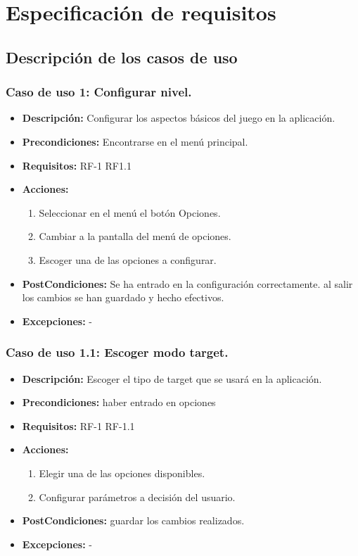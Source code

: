 \section{Especificación de requisitos}

\subsection{Descripción de los casos de uso}
\subsubsection{Caso de uso 1: Configurar nivel.}
\begin{itemize}
	\item \textbf{Descripción:} Configurar los aspectos básicos del juego en la aplicación.
	\item \textbf{Precondiciones:} Encontrarse en el menú principal.
	\item \textbf{Requisitos:} RF-1 RF1.1
	\item \textbf{Acciones:}
	\begin{enumerate}
		\item Seleccionar en el menú el botón Opciones.
		\item Cambiar a la pantalla del menú de opciones.		
		\item Escoger una de las opciones a configurar.		
	\end{enumerate}
	\item \textbf{PostCondiciones:} Se ha entrado en la configuración correctamente. al salir los cambios se han guardado y hecho efectivos.
	\item \textbf{Excepciones:} -
\end{itemize}
\subsubsection{Caso de uso 1.1: Escoger modo target.}
\begin{itemize}
	\item \textbf{Descripción:} Escoger el tipo de target que se usará en la aplicación.
	\item \textbf{Precondiciones:} haber entrado en opciones
	\item \textbf{Requisitos:} RF-1 RF-1.1
	\item \textbf{Acciones:}
	\begin{enumerate}
		\item Elegir una de las opciones disponibles.
		\item Configurar parámetros a decisión del usuario.
	\end{enumerate}
	\item \textbf{PostCondiciones:} guardar los cambios realizados.
	\item \textbf{Excepciones:} -
\end{itemize}
